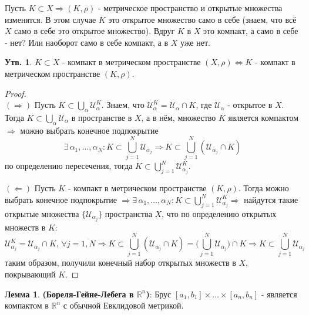 \documentclass[12pt]{article}
\newcommand{\MR}{\mathbb{R}}
\newcommand{\MU}{\mathcal{U}}
\theoremstyle{definition}
\newtheorem{prop}{Утв.}
\newtheorem{lemma}{Лемма}
\begin{document}
Пусть $K \subset X \Rightarrow (K,\rho)$ - метрическое пространство и открытые множества изменятся. В этом случае $K$ это открытое множество само в себе (знаем, что всё $X$ само в себе это открытое множество). Вдруг $K$ в $X$ это компакт, а само в себе - нет? Или наоборот само в себе компакт, а в $X$ уже нет.

\begin{prop}
	$K\subset X$ - компакт в метрическом пространстве $(X,\rho) \Leftrightarrow K$ - компакт в метрическом пространстве $(K, \rho)$.
\end{prop}
\begin{proof}\hfill\\
	$(\Rightarrow)$ Пусть $K \subset \bigcup\limits_\alpha \MU_\alpha^K$. Знаем, что $\MU_\alpha^K = \MU_\alpha \cap K$, где $\MU_\alpha$ - открытое в $X$. Тогда $K \subset \bigcup\limits_\alpha \MU_\alpha$ в пространстве  в $X$, а в нём, множество $K$ является компактом $\Rightarrow$ можно выбрать конечное подпокрытие 
	$$
		\exists \, \alpha_1, \dotsc, \alpha_N\colon K \subset \textstyle \bigcup\limits_{j = 1}^N \MU_{\alpha_j} \Rightarrow K \subset \textstyle \bigcup\limits_{j = 1}^N (\MU_{\alpha_j} \cap K)
	$$
	по определению пересечения, тогда $K \subset \textstyle \bigcup\limits_{j = 1}^N \MU_{\alpha_j}^K$.
	
	$(\Leftarrow)$ Пусть $K$ - компакт в метрическом пространстве $(K,\rho)$. Тогда можно выбрать конечное подпокрытие $\Rightarrow \exists \, \alpha_1, \dotsc, \alpha_N\colon K \subset \bigcup\limits_{j = 1}^N \MU^K_{\alpha_j} \Rightarrow$ найдутся такие открытые множества $\{\MU_{\alpha_j}\}$ пространства $X$, что по определению открытых множеств в $K$:
	$$
		\MU^K_{\alpha_j} =  \MU_{\alpha_j} \cap K, \, \forall j = \overline{1,N} \Rightarrow K \subset \textstyle \bigcup\limits_{j = 1}^N (\MU_{\alpha_j} \cap K) = \textstyle \bigg(\bigcup\limits_{j = 1}^N \MU_{\alpha_j}\bigg) \cap K \Rightarrow K \subset \bigcup\limits_{j = 1}^N \MU_{\alpha_j}
	$$
	таким образом, получили конечный набор открытых множеств в $X$, покрывающий $K$.
\end{proof}
\begin{lemma}\textbf{(Бореля-Гейне-Лебега в $\MR^n$)}: Брус $[a_1,b_1]\times\dotsc\times[a_n,b_n]$ - является компактом в $\MR^n$ с обычной Евклидовой метрикой.
\end{lemma}
\end{document}
